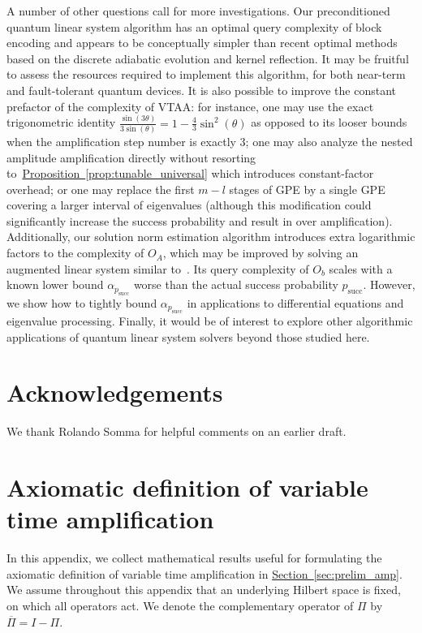 \documentclass[letterpaper,onecolumn,11pt,accepted=2026-02-14]{quantumarticle}
\theoremstyle{remark}
\theoremstyle{plain}
\newcommand{\prop}[1]{\hyperref[prop:#1]{Proposition~\ref*{prop:#1}}}
\renewcommand{\sec}[1]{\hyperref[sec:#1]{Section~\ref*{sec:#1}}}
\begin{document}
A number of other questions call for more investigations. Our preconditioned quantum linear system algorithm has an optimal query complexity of block encoding and appears to be conceptually simpler than recent optimal methods based on the discrete adiabatic evolution and kernel reflection. It may be fruitful to assess the resources required to implement this algorithm, for both near-term and fault-tolerant quantum devices.
It is also possible to improve the constant prefactor of the complexity of VTAA: for instance, one may use the exact trigonometric identity $\frac{\sin(3\theta)}{3\sin(\theta)}=1-\frac{4}{3}\sin^2(\theta)$ as opposed to its looser bounds when the amplification step number is exactly $3$; one may also analyze the nested amplitude amplification directly without resorting to~\prop{tunable_universal} which introduces constant-factor overhead; or one may replace the first $m-l$ stages of GPE by a single GPE covering a larger interval of eigenvalues (although this modification could significantly increase the success probability and result in over amplification).
Additionally, our solution norm estimation algorithm introduces extra logarithmic factors to the complexity of $O_A$, which may be improved by solving an augmented linear system similar to~\cite{Dalzell2024shortcut}. 
Its query complexity of $O_b$ scales with a known lower bound $\alpha_{p_{\text{succ}}}$ worse than the actual success probability $p_{\text{succ}}$. However, we show how to tightly bound $\alpha_{p_{\text{succ}}}$ in applications to differential equations and eigenvalue processing.
Finally, it would be of interest to explore other algorithmic applications of quantum linear system solvers beyond those studied here.


\section*{Acknowledgements}
We thank Rolando Somma for helpful comments on an earlier draft.

\appendix
\section{Axiomatic definition of variable time amplification}
\label{append:axiom}

In this appendix, we collect mathematical results useful for formulating the axiomatic definition of variable time amplification in \sec{prelim_amp}.
We assume throughout this appendix that an underlying Hilbert space is fixed, on which all operators act.
We denote the complementary operator of $\Pi$ by $\overline{\Pi}=I-\Pi$.
\end{document}
